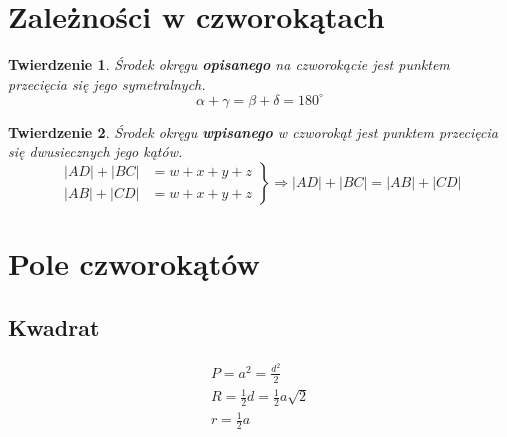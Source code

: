 \documentclass{article}
\numberwithin{equation}{section}
\newtheorem{theorem}{Twierdzenie}[section]
\begin{document}
  \section{Zależności w czworokątach}
    \begin{theorem}
      Środek okręgu \textbf{opisanego} na czworokącie jest punktem przecięcia się jego symetralnych.
      \begin{equation}
        \alpha + \gamma = \beta + \delta = 180^\circ
      \end{equation}
    \end{theorem}
    \begin{theorem}
      Środek okręgu \textbf{wpisanego} w czworokąt jest punktem przecięcia się dwusiecznych jego kątów.
      \begin{equation}
        \left.
          \begin{aligned}
            |AD| + |BC| &= w+x+y+z\\
            |AB| + |CD| &= w+x+y+z
          \end{aligned}
        \right\}
        \Rightarrow |AD| + |BC| = |AB| + |CD|
      \end{equation}
    \end{theorem}

  \section{Pole czworokątów}
    \subsection{Kwadrat}
      \begin{center}
      \end{center}
      \begin{gather}
        P = a^2 = \frac{d^2}{2}\\
        R = \frac 12d = \frac 12a\sqrt2\\
        r = \frac 12a
      \end{gather}
\end{document}
